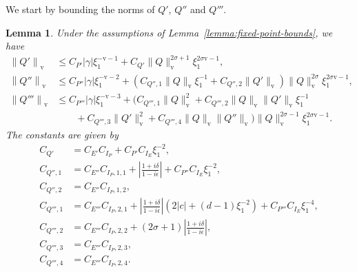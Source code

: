 \documentclass[11pt]{article}
\newcommand{\normv}{\mathrm{v}}
\newtheorem{lemma}[definition]{Lemma}
\begin{document}
We start by bounding the norms of \(Q'\), \(Q''\) and \(Q'''\).
\begin{lemma}\label{lemma:norm-dQ}
  Under the assumptions of Lemma~\ref{lemma:fixed-point-bounds}, we
  have
  \begin{align*}
    \left\|Q'\right\|_{\normv}
    &\leq C_{P'}|\gamma|\xi_{1}^{-\normv - 1}
      + C_{Q'}\|Q\|_{\normv}^{2\sigma + 1}\xi_{1}^{2\sigma\normv - 1},\\
    \left\|Q''\right\|_{\normv}
    &\leq C_{P''}|\gamma|\xi_{1}^{-\normv - 2}
      + \left(
      C_{Q'',1}\|Q\|_{\normv}\xi_{1}^{-1}
      + C_{Q'',2}\|Q'\|_{\normv}
      \right)\|Q\|_{\normv}^{2\sigma}\xi_{1}^{2\sigma\normv - 1},\\
    \left\|Q'''\right\|_{\normv}
    &\leq C_{P'''}|\gamma|\xi_{1}^{-\normv - 3}
      + \Big(
      C_{Q''',1}\|Q\|_{\normv}^{2}
      + C_{Q''',2}\|Q\|_{\normv}\|Q'\|_{\normv}\xi_{1}^{-1}\\
    &\qquad+ C_{Q''',3}\|Q'\|_{\normv}^{2}
      + C_{Q''',4}\|Q\|_{\normv}\|Q''\|_{\normv}
      \Big)\|Q\|_{\normv}^{2\sigma - 1}\xi_{1}^{2\sigma\normv - 1}.
  \end{align*}
  The constants are given by
  \begin{align*}
    C_{Q'}
    &= C_{E'}C_{I_{P}}
      + C_{P'}C_{I_{E}}\xi_{1}^{-2},\\
    C_{Q'',1}
    &= C_{E''}C_{I_{P},1,1}
      + \left|\frac{1 + i\delta}{1 - i\epsilon}\right|
      + C_{P''}C_{I_{E}}\xi_{1}^{-2},\\
    C_{Q'',2}
    &= C_{E''}C_{I_{P},1,2},\\
    C_{Q''',1}
    &= C_{E'''}C_{I_{P},2,1}
      + \left|\frac{1 + i\delta}{1 - i\epsilon}\right|(2|c| + (d - 1)\xi_{1}^{-2})
      + C_{P'''}C_{I_{E}}\xi_{1}^{-4},\\
    C_{Q''',2}
    &= C_{E'''}C_{I_{P},2,2}
      + (2\sigma + 1)\left|\frac{1 + i\delta}{1 - i\epsilon}\right|,\\
    C_{Q''',3}
    &= C_{E'''}C_{I_{P},2,3},\\
    C_{Q''',4}
    &= C_{E'''}C_{I_{P},2,4}.
  \end{align*}
\end{lemma}
\end{document}

